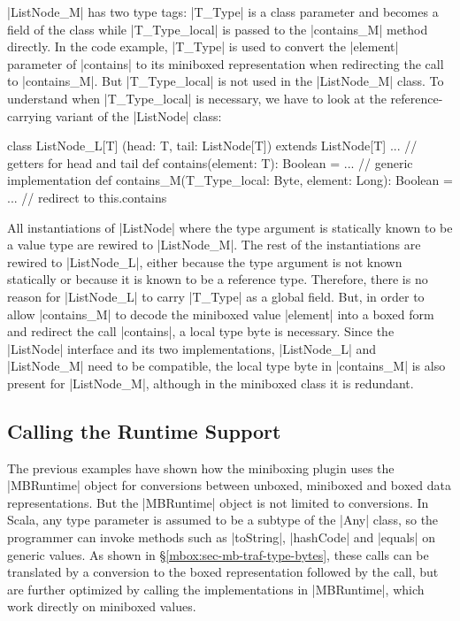 |ListNode_M| has two type tags: |T_Type| is a class parameter and becomes a field of the class while |T_Type_local| is passed to the |contains_M| method directly. In the code example, |T_Type| is used to convert the |element| parameter of |contains| to its miniboxed representation when redirecting the call to |contains_M|. But |T_Type_local| is not used in the |ListNode_M| class. To understand when |T_Type_local| is necessary, we have to look at the re\-fe\-rence-carrying variant of the |ListNode| class:

\begin{lstlisting-nobreak}
 class ListNode_L[T]
   (head: T, tail: ListNode[T]) extends ListNode[T] {
   ... // getters for head and tail
   def contains(element: T): Boolean =
         ... // generic implementation
   def contains_M(T_Type_local: Byte, element: Long): Boolean =
         ... // redirect to this.contains
 }
\end{lstlisting-nobreak}

All instantiations of |ListNode| where the type argument is statically known to be a value type are rewired to |ListNode_M|. The rest of the instantiations are rewired to |ListNode_L|, either because the type argument is not known statically or because it is known to be a reference type. Therefore, there is no reason for |ListNode_L| to carry |T_Type| as a global field. But, in order to allow |contains_M| to decode the miniboxed value |element| into a boxed form and redirect the call |contains|, a local type byte is necessary. Since the |ListNode| interface and its two implementations, |ListNode_L| and |ListNode_M| need to be compatible, the local type byte in |contains_M| is also present for |ListNode_M|, although in the miniboxed class it is redundant.

\subsection{Calling the Runtime Support}
\label{mbox:sec-mb-traf-runtime}

The previous examples have shown how the miniboxing plugin uses the |MBRuntime| object for conversions between unboxed, miniboxed and boxed data representations. But the |MBRuntime| object is not limited to conversions. In Scala, any type parameter is assumed to be a subtype of the |Any| class, so the programmer can invoke methods such as |toString|, |hashCode| and |equals| on generic values. As shown in \S\ref{mbox:sec-mb-traf-type-bytes}, these calls can be translated by a conversion to the boxed representation followed by the call, but are further optimized by calling the implementations in |MBRuntime|, which work directly on miniboxed values.

